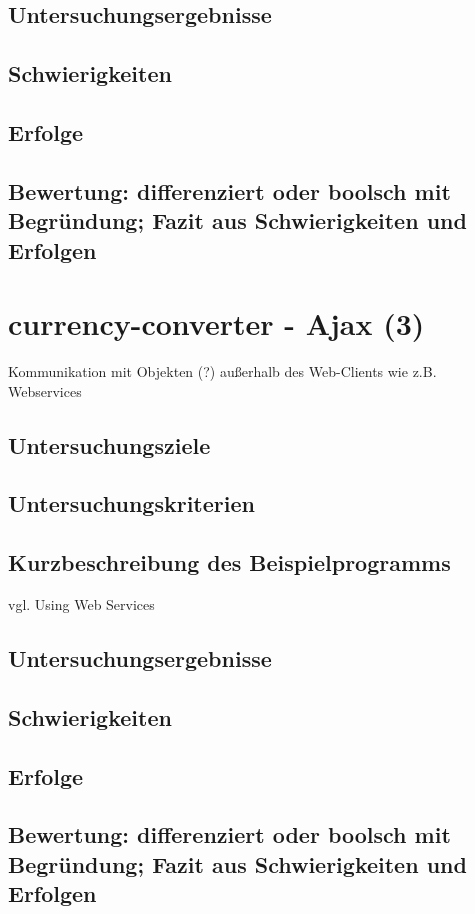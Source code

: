 \documentclass[a4paper, 12pt, listof=totoc, bibliography=totoc]{scrreprt}
\begin{document}
\subsection{Untersuchungsergebnisse}
\subsection{Schwierigkeiten}
\subsection{Erfolge}
\subsection{Bewertung: differenziert oder boolsch mit Begründung; Fazit aus Schwierigkeiten und Erfolgen}

\section{currency-converter - Ajax (3)}
Kommunikation mit Objekten (?) außerhalb des Web-Clients wie z.B. Webservices
\subsection{Untersuchungsziele}
\subsection{Untersuchungskriterien}
\subsection{Kurzbeschreibung des Beispielprogramms}
vgl. Using Web Services \cite{haoyi.HOS}
\subsection{Untersuchungsergebnisse}
\subsection{Schwierigkeiten}
\subsection{Erfolge}
\subsection{Bewertung: differenziert oder boolsch mit Begründung; Fazit aus Schwierigkeiten und Erfolgen}
\end{document}
